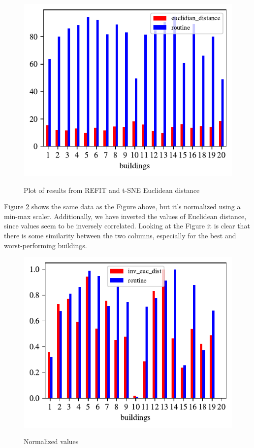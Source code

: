 \begin{figure}[H]
	\centering
	\caption{Plot of results from REFIT and t-SNE Euclidean distance }
	\includegraphics[]{Figures/EC/CORR_TSNE/TSNE_EC_comparison.pdf}
	\label{fig:tsne_comparison}
\end{figure}

Figure \ref{fig:tsne_norm} shows the same data as the Figure above, but it's normalized using a min-max scaler.
Additionally, we have inverted the values of Euclidean distance, since values seem to be inversely correlated.
Looking at the Figure it is clear that there is some similarity between the two columns,
especially for the best and worst-performing buildings.

\begin{figure}[H]
	\centering
	\caption{Normalized values}
	\includegraphics[]{Figures/EC/CORR_TSNE/TSNE_EC_norm.pdf}
	\label{fig:tsne_norm}
\end{figure}

